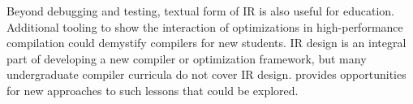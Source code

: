 Beyond debugging and testing, textual form of IR is
also useful for education. Additional tooling to show the interaction of
optimizations in high-performance compilation could demystify compilers for new
students. IR design is an integral part of developing a new compiler or
optimization framework, but many undergraduate compiler curricula do not
cover IR design. \MLIR provides opportunities for new approaches to such 
lessons that could be explored.
